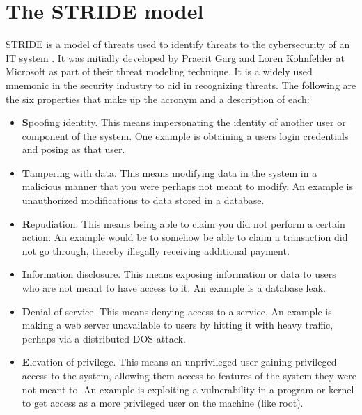 \section{The STRIDE model} \label{ch:method:stride}
STRIDE is a model of threats used to identify threats to the cybersecurity of an IT system \cite{stride}. It was initially developed by Praerit Garg and Loren Kohnfelder at Microsoft as part of their threat modeling technique. It is a widely used mnemonic in the security industry to aid in recognizing threats. The following are the six properties that make up the acronym and a description of each:
\begin{itemize}
    \item \textbf{S}poofing identity. This means impersonating the identity of another user or component of the system. One example is obtaining a users login credentials and posing as that user.
    \item \textbf{T}ampering with data. This means modifying data in the system in a malicious manner that you were perhaps not meant to modify. An example is unauthorized modifications to data stored in a database.
    \item \textbf{R}epudiation. This means being able to claim you did not perform a certain action. An example would be to somehow be able to claim a transaction did not go through, thereby illegally receiving additional payment.
    \item \textbf{I}nformation disclosure. This means exposing information or data to users who are not meant to have access to it. An example is a database leak.
    \item \textbf{D}enial of service. This means denying access to a service. An example is making a web server unavailable to users by hitting it with heavy traffic, perhaps via a distributed \gls{DOS} attack.
    \item \textbf{E}levation of privilege. This means an unprivileged user gaining privileged access to the system, allowing them access to features of the system they were not meant to. An example is exploiting a vulnerability in a program or kernel to get access as a more privileged user on the machine (like root).
\end{itemize}
